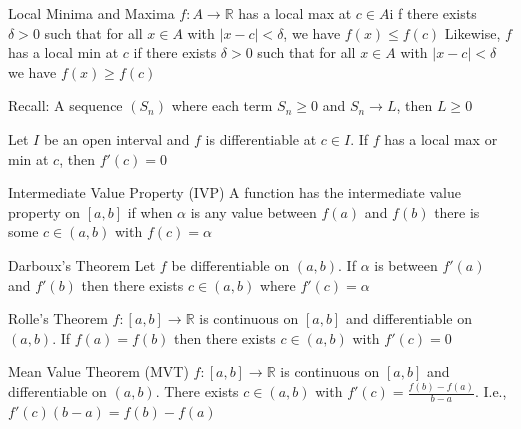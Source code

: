 \documentclass[12pt]{article}
\begin{document}
\begin{definition}{Local Minima and Maxima}{}
    $ f : A \to \mathbb{R} $ has a local max at $ c \in A $i f there exists $ \delta > 0 $ such that for all $ x \in A $ with $ | x - c | < \delta $, we have $ f \left( x \right) \leq f \left( c \right) $
    \medskip
    \newline
    Likewise, $ f $ has a local min at $ c $ if there exists $ \delta > 0 $ such that for all $ x \in A $ with $ | x - c | < \delta $ we have $ f \left( x \right) \geq f \left( c \right) $
\end{definition}
\begin{note}{}{}
    Recall: A sequence $ \left( S_n \right) $ where each term $ S_n \geq 0 $ and $ S_n \to L $, then $ L \geq 0 $
\end{note}
\begin{proposition}{}{}
    Let $ I $ be an open interval and $ f $ is differentiable at $ c \in I $. If $ f $ has a local max or min at $ c $, then $ f' \left( c \right) = 0 $
\end{proposition}
\begin{note}{Intermediate Value Property (IVP)}{}
    A function has the intermediate value property on $ \left[ a, b \right] $ if when $ \alpha $ is any value between $ f \left( a \right) $ and $ f \left( b \right) $ there is some $ c \in \left( a, b \right) $ with $ f \left( c \right) = \alpha $
\end{note}
\begin{theorem}{Darboux's Theorem}{}
    Let $ f $ be differentiable on $ \left( a, b \right) $. If $ \alpha $ is between $ f' \left( a \right) $ and $ f' \left( b \right) $ then there exists $ c \in \left( a, b \right) $ where $ f' \left( c \right) = \alpha $
\end{theorem}
\begin{theorem}{Rolle's Theorem}{}
    $ f : \left[ a, b \right] \to \mathbb{R} $ is continuous on $ \left[ a, b \right] $ and differentiable on $ \left( a, b \right) $. If $ f \left( a \right) = f \left( b \right) $ then there exists $ c \in \left( a, b \right) $ with $ f' \left( c \right) = 0 $
\end{theorem}
\begin{theorem}{Mean Value Theorem (MVT)}{}
    $ f: \left[ a, b \right] \to \mathbb{R} $ is continuous on $ \left[ a, b \right] $ and differentiable on $ \left( a, b \right) $. There exists $ c \in \left( a, b \right) $ with $ f' \left( c \right) = \frac{f \left( b \right) - f \left( a \right)}{b - a} $. I.e., $ f' \left( c \right) \left( b - a \right) = f \left( b \right) - f \left( a \right) $
\end{theorem}
\end{document}
